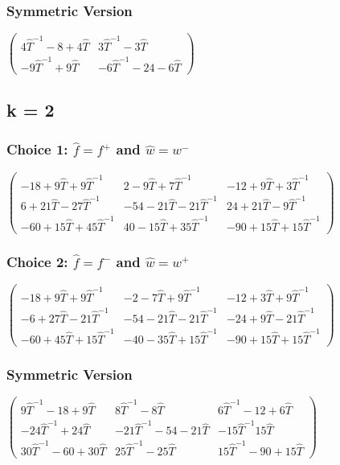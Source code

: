 \documentclass[final]{siamltex}
\begin{document}
\subsubsection{Symmetric Version}
$\left(\begin{array}{cc}
4\hat{T}^{-1} -8+4 \hat{T} & 3\hat{T}^{-1}-3 \hat{T} \\
-9 \hat{T}^{-1} +9 \hat{T} & -6 \hat{T}^{-1} -24-6 \hat{T}
\end{array}\right)$

\subsection{k = 2}
\subsubsection{Choice 1: $\hat{f} = f^+$ and $\hat{w} = w^-$}
$\left(
\begin{array}{ccc}
 -18+9 \hat{T}+9 \hat{T}^{-1}& 2-9 \hat{T}+7 \hat{T}^{-1}& -12+9 \hat{T}+3 \hat{T}^{-1}\\
 6+21 \hat{T}-27 \hat{T}^{-1}& -54-21 \hat{T}-21 \hat{T}^{-1}& 24+21 \hat{T}-9 \hat{T}^{-1}\\
 -60+15 \hat{T}+45 \hat{T}^{-1}& 40-15 \hat{T}+35 \hat{T}^{-1}& -90+15 \hat{T}+15 \hat{T}^{-1}
\end{array}
\right)$

\subsubsection{Choice 2: $\hat{f} = f^-$ and $\hat{w} = w^+$}
$\left(
\begin{array}{ccc}
 -18+9 \hat{T}+9 \hat{T}^{-1}& -2-7 \hat{T}+9 \hat{T}^{-1}& -12+3 \hat{T}+9 \hat{T}^{-1}\\
 -6+27 \hat{T}-21 \hat{T}^{-1}& -54-21 \hat{T}-21 \hat{T}^{-1}& -24+9 \hat{T}-21 \hat{T}^{-1}\\
 -60+45 \hat{T}+15 \hat{T}^{-1}& -40-35 \hat{T}+15 \hat{T}^{-1}& -90+15 \hat{T}+15 \hat{T}^{-1}
\end{array}
\right)$

\subsubsection{Symmetric Version}
$\left(
\begin{array}{ccc}
 9 \hat{T}^{-1}-18+9 \hat{T} & 8 \hat{T}^{-1} -8 \hat{T}& 6 \hat{T}^{-1}-12+6 \hat{T} \\
 -24 \hat{T}^{-1}+24 \hat{T} & -21 \hat{T}^{-1}-54-21 \hat{T} & -15 \hat{T}^{-1}15 \hat{T} \\
 30 \hat{T}^{-1}-60+30 \hat{T} & 25 \hat{T}^{-1}-25 \hat{T} & 15 \hat{T}^{-1}-90+15 \hat{T}
\end{array}
\right)$
\end{document}
